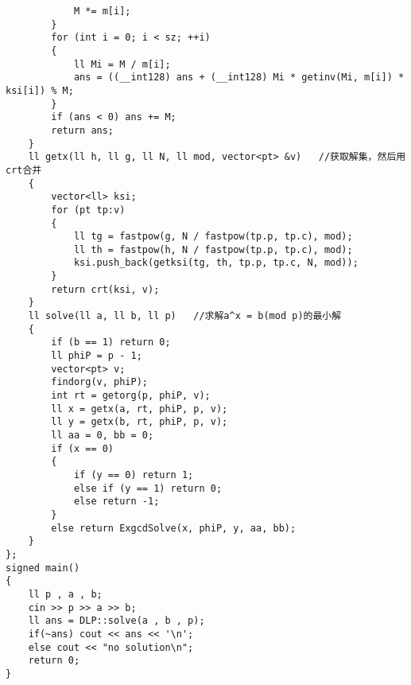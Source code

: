 \documentclass[E:/GsjzTle/main/main.tex]{subfiles}
\begin{document}
\begin{lstlisting}
			M *= m[i];
		}
		for (int i = 0; i < sz; ++i)
		{
			ll Mi = M / m[i];
			ans = ((__int128) ans + (__int128) Mi * getinv(Mi, m[i]) * ksi[i]) % M;
		}
		if (ans < 0) ans += M;
		return ans;
	}
	ll getx(ll h, ll g, ll N, ll mod, vector<pt> &v)   //获取解集，然后用crt合并
	{
		vector<ll> ksi;
		for (pt tp:v)
		{
			ll tg = fastpow(g, N / fastpow(tp.p, tp.c), mod);
			ll th = fastpow(h, N / fastpow(tp.p, tp.c), mod);
			ksi.push_back(getksi(tg, th, tp.p, tp.c, N, mod));
		}
		return crt(ksi, v);
	}
	ll solve(ll a, ll b, ll p)   //求解a^x = b(mod p)的最小解
	{
		if (b == 1) return 0;
		ll phiP = p - 1;
		vector<pt> v;
		findorg(v, phiP);
		int rt = getorg(p, phiP, v);
		ll x = getx(a, rt, phiP, p, v);
		ll y = getx(b, rt, phiP, p, v);
		ll aa = 0, bb = 0;
		if (x == 0)
		{
			if (y == 0) return 1;
			else if (y == 1) return 0;
			else return -1;
		}
		else return ExgcdSolve(x, phiP, y, aa, bb);
	}
};
signed main()
{
	ll p , a , b;
	cin >> p >> a >> b;
	ll ans = DLP::solve(a , b , p);
	if(~ans) cout << ans << '\n';
	else cout << "no solution\n";
	return 0;
}
\end{lstlisting}
\end{document}
